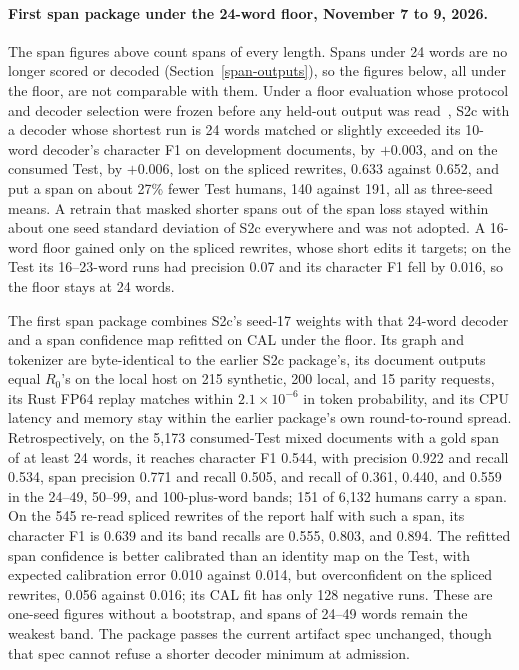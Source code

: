\paragraph{First span package under the 24-word floor, November 7 to 9, 2026.}\label{span-package-evidence}
The span figures above count spans of every length. Spans under 24 words are
no longer scored or decoded (Section~\ref{span-outputs}), so the figures below,
all under the floor, are not comparable with them. Under a floor evaluation
whose protocol and decoder selection were frozen before any held-out output was
read~\cite{spanspackage}, S2c with a decoder whose shortest run is 24 words matched or slightly
exceeded its 10-word decoder's character F1 on development documents, by
\(+0.003\), and on the consumed Test, by \(+0.006\), lost on the spliced
rewrites, 0.633 against 0.652, and put a span on about 27\% fewer Test humans,
140 against 191, all as three-seed means. A retrain that masked shorter
spans out of the span loss stayed within about one seed standard deviation of
S2c everywhere and was not adopted. A 16-word floor gained only on the spliced
rewrites, whose short edits it targets; on the Test its 16--23-word runs had
precision 0.07 and its character F1 fell by 0.016, so the floor stays at 24
words.

The first span package combines S2c's seed-17 weights with that 24-word
decoder and a span confidence map refitted on CAL under the floor. Its graph and
tokenizer are byte-identical to the earlier S2c package's, its document outputs
equal \(R_0\)'s on the local host on 215 synthetic, 200 local, and 15 parity
requests, its Rust
FP64 replay matches within \(2.1\times10^{-6}\) in token probability, and
its CPU latency and memory stay within the earlier package's own
round-to-round spread. Retrospectively, on the 5,173 consumed-Test mixed
documents with a gold span of at least 24 words, it reaches character F1 0.544,
with precision 0.922 and recall 0.534, span precision 0.771 and recall 0.505,
and recall of 0.361, 0.440, and 0.559 in the 24--49, 50--99, and 100-plus-word
bands; 151 of 6,132 humans carry a span. On the 545 re-read spliced rewrites of
the report half with such a span, its character F1 is 0.639 and its band
recalls are 0.555, 0.803, and 0.894. The refitted span confidence is better
calibrated than an identity map on the Test, with expected calibration error
0.010 against 0.014, but overconfident on the spliced rewrites, 0.056 against
0.016; its CAL fit has only 128 negative runs. These are one-seed figures
without a bootstrap, and spans of 24--49 words remain the weakest band. The
package passes the current artifact spec unchanged, though that spec cannot
refuse a shorter decoder minimum at admission.

